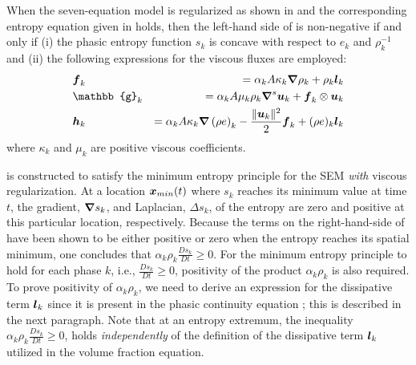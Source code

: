 \begin{lemma}\label{lmm:lemma-1}
When the seven-equation model is regularized as shown in  and the corresponding entropy equation given in  holds, then 
the left-hand side of  is non-negative if and only if 
(i) the phasic entropy function $s_k$ is concave with respect to $e_k$ and $\rho_k^{-1}$ and 
(ii) the following expressions for the viscous fluxes are employed:
\begin{align}
&  \mbold f_k &= \alpha_k A \kappa_k \grad \rho_k + \rho_k  \mbold l_k 
  \\
&  \mathbb{g}_k &= \alpha_k A \mu_k \rho_k \grad^s \mbold u_k + \mbold f_k \otimes \mbold u_k 
  \\
&  \mbold h_k &=  \alpha_k A \kappa_k \grad \left( \rho e \right)_k  - \frac{\| \mbold u_k \|^2}{2} \mbold f_k + (\rho e)_k \mbold l_k 
\end{align}
where $\kappa_k$ and $\mu_k$ are positive viscous coefficients.
\end{lemma}

 is constructed to satisfy the minimum entropy principle for the SEM \emph{with} viscous regularization. 
At a location $\boldsymbol x_{min}(t)$ where $s_k$ reaches its minimum value at time $t$, the gradient, $\boldsymbol\nabla s_k$, and Laplacian, $\Delta s_k$, 
of the entropy are zero and positive at this particular location, respectively. Because the terms on the right-hand-side of 
 have been shown to be either positive or zero when 
the entropy reaches its spatial minimum, one concludes that $\alpha_k \rho_k \frac{D s_k}{Dt} \geq 0$. For the minimum entropy principle to hold for each phase $k$, i.e., $\frac{D s_k}{Dt}\geq 0$, positivity of the product $\alpha_k \rho_k$ is also required. To prove positivity of $\alpha_k \rho_k$, we need to derive an expression for the dissipative term $\boldsymbol l_k$ since it is present in the phasic continuity equation ; this is described in the next paragraph. Note that 
at an entropy extremum, the inequality $\alpha_k \rho_k \frac{D s_k}{Dt} \geq 0$, holds {\it independently} of the definition of the dissipative term $\boldsymbol l_k$ utilized in the volume fraction equation. 
%
